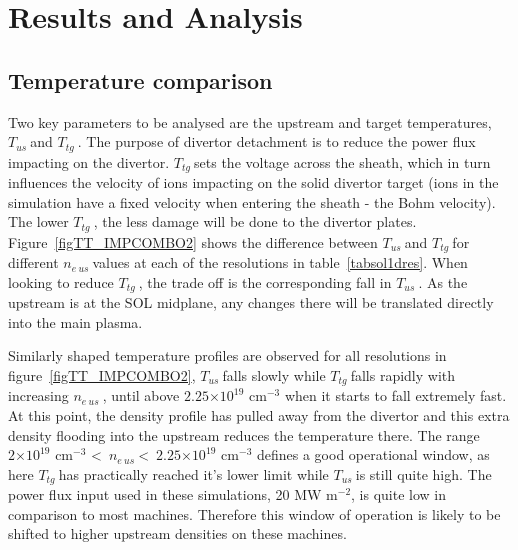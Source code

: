 \documentclass[12pt]{article}  %
\providecommand{\e}[1]{\ensuremath{\times 10^{#1}}} %
\providecommand{\pow}[1]{{$^{#1}$}} %
\providecommand{\neus}{$n_{e~us}~$} %
\providecommand{\Tus}{$T_{us}~$} %
\providecommand{\Ttg}{$T_{tg}~$} %
\begin{document}
\section{Results and Analysis}\label{secResults}
\subsection{Temperature comparison}\label{ssectempcomp}
Two key parameters to be analysed are the upstream and target temperatures, \Tus and \Ttg. The purpose of divertor detachment is to reduce the power flux impacting on the divertor. \Ttg sets the voltage across the sheath, which in turn influences the velocity of ions impacting on the solid divertor target (ions in the simulation have a fixed velocity when entering the sheath - the Bohm velocity). The lower \Ttg, the less damage will be done to the divertor plates. Figure~\ref{figTT_IMPCOMBO2} shows the difference between \Tus and \Ttg for different \neus values at each of the resolutions in table~\ref{tabsol1dres}. When looking to reduce \Ttg, the trade off is the corresponding fall in \Tus. As the upstream is at the SOL midplane, any changes there will be translated directly into the main plasma. 

Similarly shaped temperature profiles are observed for all resolutions in figure~\ref{figTT_IMPCOMBO2}, \Tus falls slowly while \Ttg falls rapidly with increasing \neus, until above $2.25\e{19}$ cm$^{-3}$ when it starts to fall extremely fast. At this point, the density profile has pulled away from the divertor and this extra density flooding into the upstream reduces the temperature there. The range $2\e{19}$ cm$^{-3}$ \textless~\neus \textless~$2.25\e{19}$ cm$^{-3}$ defines a good operational window, as here \Ttg has practically reached it's lower limit while \Tus is still quite high. The power flux input used in these simulations, 20 MW m\pow{-2}, is quite low in comparison to most machines. Therefore this window of operation is likely to be shifted to higher upstream densities on these machines.
\end{document}
